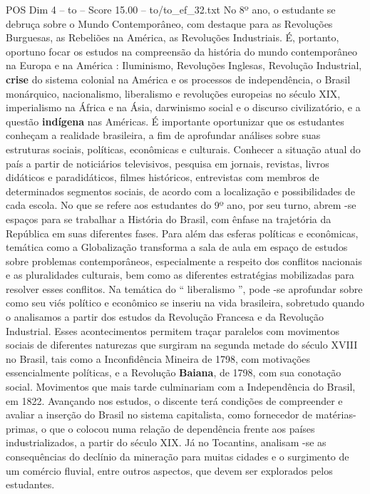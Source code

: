 \begin{textsample}{POS Dim 4 – to – Score 15.00 – to/to\_ef\_32.txt}
No 8º ano, o estudante se debruça sobre o Mundo Contemporâneo, com destaque para as Revoluções Burguesas, as Rebeliões na América, as Revoluções Industriais.
É, portanto, oportuno focar os estudos na compreensão da história do mundo contemporâneo na Europa e na América : Iluminismo, Revoluções Inglesas, Revolução Industrial, \textbf{crise} do sistema colonial na América e os processos de independência, o Brasil monárquico, nacionalismo, liberalismo e revoluções europeias no século XIX, imperialismo na África e na Ásia, darwinismo social e o discurso civilizatório, e a questão \textbf{indígena} nas Américas.
É importante oportunizar que os estudantes conheçam a realidade brasileira, a fim de aprofundar análises sobre suas estruturas sociais, políticas, econômicas e culturais.
Conhecer a situação atual do país a partir de noticiários televisivos, pesquisa em jornais, revistas, livros didáticos e paradidáticos, filmes históricos, entrevistas com membros de determinados segmentos sociais, de acordo com a localização e possibilidades de cada escola.
No que se refere aos estudantes do 9º ano, por seu turno, abrem -se espaços para se trabalhar a História do Brasil, com ênfase na trajetória da República em suas diferentes fases.
Para além das esferas políticas e econômicas, temática como a Globalização transforma a sala de aula em espaço de estudos sobre problemas contemporâneos, especialmente a respeito dos conflitos nacionais e as pluralidades culturais, bem como as diferentes estratégias mobilizadas para resolver esses conflitos.
Na temática do “ liberalismo ”, pode -se aprofundar sobre como seu viés político e econômico se inseriu na vida brasileira, sobretudo quando o analisamos a partir dos estudos da Revolução Francesa e da Revolução Industrial.
Esses acontecimentos permitem traçar paralelos com movimentos sociais de diferentes naturezas que surgiram na segunda metade do século XVIII no Brasil, tais como a Inconfidência Mineira de 1798, com motivações essencialmente políticas, e a Revolução \textbf{Baiana}, de 1798, com sua conotação social.
Movimentos que mais tarde culminariam com a Independência do Brasil, em 1822.
Avançando nos estudos, o discente terá condições de compreender e avaliar a inserção do Brasil no sistema capitalista, como fornecedor de matérias-primas, o que o colocou numa relação de dependência frente aos países industrializados, a partir do século XIX.
Já no Tocantins, analisam -se as consequências do declínio da mineração para muitas cidades e o surgimento de um comércio fluvial, entre outros aspectos, que devem ser explorados pelos estudantes.

\end{textsample}
